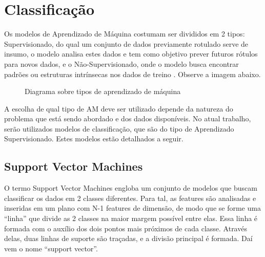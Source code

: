\section{Classificação}

Os modelos de Aprendizado de Máquina costumam ser divididos em 2 tipos: Supervisionado, do qual um conjunto de dados previamente rotulado serve de insumo, o modelo analisa estes dados e tem como objetivo prever futuros rótulos para novos dados, e o Não-Supervisionado, onde o modelo busca encontrar padrões ou estruturas intrínsecas nos dados de treino \cite{mwmachinelearning}. Observe a imagem abaixo.

\begin{figure}[!htb]
    \caption{\label{fig:my-label} Diagrama sobre tipos de aprendizado de máquina}
\end{figure}

A escolha de qual tipo de AM deve ser utilizado depende da natureza do problema que está sendo abordado e dos dados disponíveis. No atual trabalho, serão utilizados modelos de classificação, que são do tipo de Aprendizado Supervisionado. Estes modelos estão detalhados a seguir.

\subsection{Support Vector Machines}

O termo Support Vector Machines engloba um conjunto de modelos que buscam classificar os dados em 2 classes diferentes. Para tal, as features são analisadas e inseridas em um plano com N-1 features de dimensão, de modo que se forme uma “linha” que divide as 2 classes na maior margem possível entre elas. Essa linha é formada com o auxílio dos dois pontos mais próximos de cada classe. Através delas, duas linhas de suporte são traçadas, e a divisão principal é formada. Daí vem o nome “support vector”.

